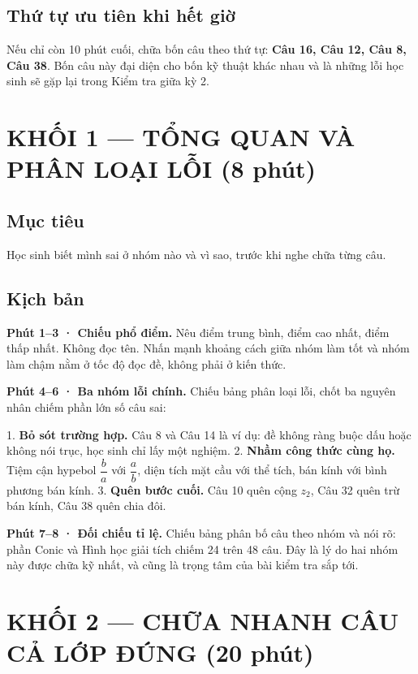 \documentclass[11pt, a4paper]{article}
\begin{document}
\subsection{Thứ tự ưu tiên khi hết giờ}

Nếu chỉ còn 10 phút cuối, chữa bốn câu theo thứ tự: \textbf{Câu 16, Câu 12, Câu 8, Câu 38}. Bốn câu này đại diện cho bốn kỹ thuật khác nhau và là những lỗi học sinh sẽ gặp lại trong Kiểm tra giữa kỳ 2.

\section{KHỐI 1 — TỔNG QUAN VÀ PHÂN LOẠI LỖI (8 phút)}

\subsection{Mục tiêu}

Học sinh biết mình sai ở nhóm nào và vì sao, trước khi nghe chữa từng câu.

\subsection{Kịch bản}

\textbf{Phút 1–3 · Chiếu phổ điểm.} Nêu điểm trung bình, điểm cao nhất, điểm thấp nhất. Không đọc tên. Nhấn mạnh khoảng cách giữa nhóm làm tốt và nhóm làm chậm nằm ở tốc độ đọc đề, không phải ở kiến thức.

\textbf{Phút 4–6 · Ba nhóm lỗi chính.} Chiếu bảng phân loại lỗi, chốt ba nguyên nhân chiếm phần lớn số câu sai:

1. \textbf{Bỏ sót trường hợp.} Câu 8 và Câu 14 là ví dụ: đề không ràng buộc dấu hoặc không nói trục, học sinh chỉ lấy một nghiệm.
2. \textbf{Nhầm công thức cùng họ.} Tiệm cận hypebol $\dfrac{b}{a}$ với $\dfrac{a}{b}$, diện tích mặt cầu với thể tích, bán kính với bình phương bán kính.
3. \textbf{Quên bước cuối.} Câu 10 quên cộng $z_2$, Câu 32 quên trừ bán kính, Câu 38 quên chia đôi.

\textbf{Phút 7–8 · Đối chiếu tỉ lệ.} Chiếu bảng phân bố câu theo nhóm và nói rõ: phần Conic và Hình học giải tích chiếm 24 trên 48 câu. Đây là lý do hai nhóm này được chữa kỹ nhất, và cũng là trọng tâm của bài kiểm tra sắp tới.

\section{KHỐI 2 — CHỮA NHANH CÂU CẢ LỚP ĐÚNG (20 phút)}
\end{document}
